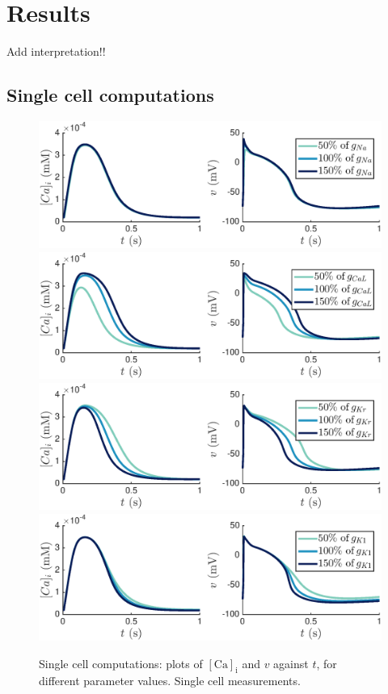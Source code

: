 \documentclass{article}
\begin{document}
%
\section{Results} \label{Results}
{\color{red} Add interpretation!!}
\subsection{Single cell computations} \label{Single cell computations}
%
\begin{figure}
   \includegraphics[trim=0cm 0cm 0cm 0cm, clip=true, width=1\linewidth]{sc_gna} 
   \includegraphics[trim=0cm 0cm 0cm 0cm, clip=true, width=1\linewidth]{sc_gcal} 
      \includegraphics[trim=0cm 0cm 0cm 0cm, clip=true, width=1\linewidth]{sc_gkr} 
         \includegraphics[trim=0cm 0cm 0cm 0cm, clip=true, width=1\linewidth]{sc_gk1} 
    \caption{Single cell computations: plots of $[\mathrm{Ca}]_{\mathrm{i}}$ and $v$  against $t$, for different parameter values. Single cell measurements.}
    \label{fig:4a}
\end{figure}
\end{document}
